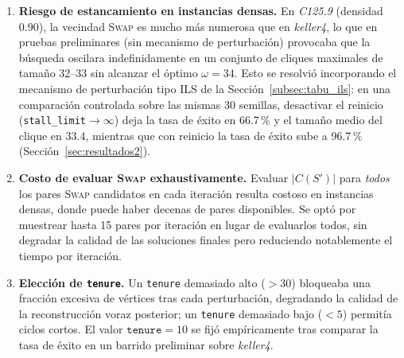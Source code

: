 \begin{enumerate}
    \item \textbf{Riesgo de estancamiento en instancias densas.} En \textit{C125.9} (densidad 0.90), la vecindad \textsc{Swap} es mucho más numerosa que en \textit{keller4}, lo que en pruebas preliminares (sin mecanismo de perturbación) provocaba que la búsqueda oscilara indefinidamente en un conjunto de cliques maximales de tamaño 32--33 sin alcanzar el óptimo $\omega=34$. Esto se resolvió incorporando el mecanismo de perturbación tipo ILS de la Sección~\ref{subsec:tabu_ils}: en una comparación controlada sobre las mismas 30 semillas, desactivar el reinicio (\texttt{stall\_limit}$\to\infty$) deja la tasa de éxito en 66.7\,\% y el tamaño medio del clique en 33.4, mientras que con reinicio la tasa de éxito sube a 96.7\,\% (Sección~\ref{sec:resultados2}).
    \item \textbf{Costo de evaluar \textsc{Swap} exhaustivamente.} Evaluar $|C(S')|$ para \emph{todos} los pares \textsc{Swap} candidatos en cada iteración resulta costoso en instancias densas, donde puede haber decenas de pares disponibles. Se optó por muestrear hasta 15 pares por iteración en lugar de evaluarlos todos, sin degradar la calidad de las soluciones finales pero reduciendo notablemente el tiempo por iteración.
    \item \textbf{Elección de \texttt{tenure}.} Un \texttt{tenure} demasiado alto ($>30$) bloqueaba una fracción excesiva de vértices tras cada perturbación, degradando la calidad de la reconstrucción voraz posterior; un \texttt{tenure} demasiado bajo ($<5$) permitía ciclos cortos. El valor $\texttt{tenure}=10$ se fijó empíricamente tras comparar la tasa de éxito en un barrido preliminar sobre \textit{keller4}.
\end{enumerate}

